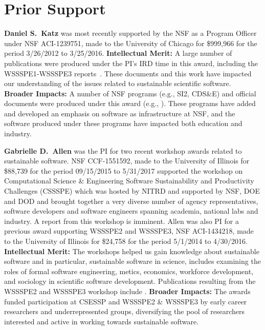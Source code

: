\documentclass[11pt]{article}
\begin{document}
\section{Prior Support} 

\textbf{Daniel S.~Katz}
was most recently supported by the NSF as a Program Officer under NSF ACI-1239751, made to the University of Chicago for \$999,966 for the period 3/26/2012 to 3/25/2016.  {\bf Intellectual Merit:} A large number of publications were produced under the PI's IRD time in this award, including the WSSSPE1-WSSSPE3 reports~\cite{WSSSPE1, WSSSPE2, WSSSPE3}. These documents and this work have impacted our understanding of the issues related to sustainable scientific software.  {\bf Broader Impacts:}
A number of NSF programs (e.g., SI2, CDS\&E) and official documents were produced under this award (e.g., \cite{NSF_software_vision}).  These programs have added and developed an emphasis on software as infrastructure at NSF, and the software produced under these programs have impacted both education and industry.

\textbf{Gabrielle D.~Allen}
was the PI for two recent workshop awards related to sustainable software. NSF CCF-1551592, made to the University of Illinois for \$88,739 for the period 09/15/2015 to 5/31/2017 supported the workshop on Computational Science \& Engineering Software Sustainability and Productivity Challenges (CSSSPE) which was hosted by NITRD and supported by NSF, DOE and DOD and brought together a very diverse number of agency representatives, software developers and software engineers spanning academia, national labs and industry. A report from this workshop is imminent. 
Allen was also PI for a previous award supporting WSSSPE2 and WSSSPE3, NSF ACI-1434218, made to the University of Illinois for \$24,758 for the period 5/1/2014 to 4/30/2016.  {\bf Intellectual Merit:} The workshops helped us gain knowledge about sustainable software and in particular, sustainable software in science, includes examining the roles of formal software engineering, metics, economics, workforce development, and sociology in scientific software development.
Publications  resulting from the WSSSPE2 and WSSSPE3 workshop include \cite{WSSSPE2-collection, WSSSPE2, WSSSPE3}. {\bf Broader Impacts:} The awards funded participation at CSESSP and WSSSPE2 \& WSSSPE3 by early career researchers and underrepresented groups, diversifying the pool of researchers interested and active in working towards sustainable software.
\end{document}
